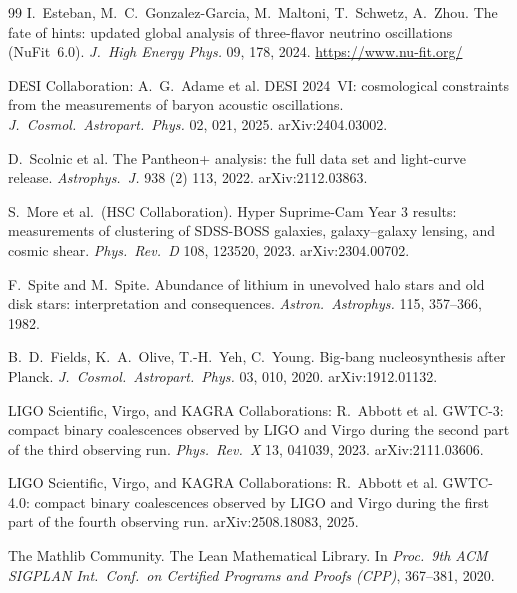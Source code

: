 \documentclass[11pt,a4paper]{amsart}
\theoremstyle{plain}
\theoremstyle{definition}
\begin{document}
\begin{thebibliography}{99}
I.~Esteban, M.~C.~Gonzalez-Garcia, M.~Maltoni, T.~Schwetz, A.~Zhou.
\newblock The fate of hints: updated global analysis of three-flavor neutrino oscillations (NuFit~6.0).
\newblock \emph{J.\ High Energy Phys.} 09, 178, 2024. \url{https://www.nu-fit.org/}

DESI Collaboration: A.~G.~Adame et al.
\newblock DESI 2024~VI: cosmological constraints from the measurements of baryon acoustic oscillations.
\newblock \emph{J.\ Cosmol.\ Astropart.\ Phys.} 02, 021, 2025. arXiv:2404.03002.

D.~Scolnic et al.
\newblock The Pantheon+ analysis: the full data set and light-curve release.
\newblock \emph{Astrophys.\ J.} 938 (2) 113, 2022. arXiv:2112.03863.

S.~More et al.\ (HSC Collaboration).
\newblock Hyper Suprime-Cam Year 3 results: measurements of clustering of SDSS-BOSS galaxies, galaxy--galaxy lensing, and cosmic shear.
\newblock \emph{Phys.\ Rev.\ D} 108, 123520, 2023. arXiv:2304.00702.

F.~Spite and M.~Spite.
\newblock Abundance of lithium in unevolved halo stars and old disk stars: interpretation and consequences.
\newblock \emph{Astron.\ Astrophys.} 115, 357--366, 1982.

B.~D.~Fields, K.~A.~Olive, T.-H.~Yeh, C.~Young.
\newblock Big-bang nucleosynthesis after Planck.
\newblock \emph{J.\ Cosmol.\ Astropart.\ Phys.} 03, 010, 2020. arXiv:1912.01132.

LIGO Scientific, Virgo, and KAGRA Collaborations: R.~Abbott et al.
\newblock GWTC-3: compact binary coalescences observed by LIGO and Virgo during the second part of the third observing run.
\newblock \emph{Phys.\ Rev.\ X} 13, 041039, 2023. arXiv:2111.03606.

LIGO Scientific, Virgo, and KAGRA Collaborations: R.~Abbott et al.
\newblock GWTC-4.0: compact binary coalescences observed by LIGO and Virgo during the first part of the fourth observing run.
\newblock arXiv:2508.18083, 2025.

The Mathlib Community.
\newblock The Lean Mathematical Library.
\newblock In \emph{Proc.\ 9th ACM SIGPLAN Int.\ Conf.\ on Certified Programs and Proofs (CPP)}, 367--381, 2020.

\end{thebibliography}
\end{document}
